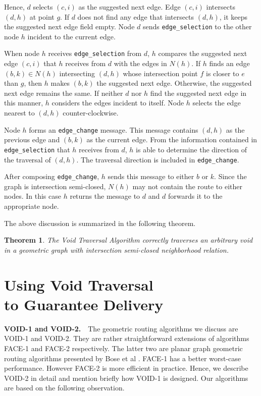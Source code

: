 \documentclass[conference]{IEEEtran}
\newtheorem{theorem}{Theorem}
\def\TT#1{\texttt{#1}}
\begin{document}
Hence, $d$ selects $(c,i)$ as the suggested next edge. Edge $(c,i)$
intersects $(d,h)$ at point $g$.  If $d$ does not find any edge that
intersects $(d,h)$, it keeps the suggested next edge field empty.
Node $d$ sends \TT{edge\_selection} to the other node $h$ incident to
the current edge.

When node $h$ receives \TT{edge\_selection} from $d$, $h$ compares the
suggested next edge $(c,i)$ that $h$ receives from $d$ with the edges
in $N(h)$.  If $h$ finds an edge $(b,k) \in N(h)$ intersecting $(d,h)$
whose intersection point $f$ is closer to $e$ than $g$, then $h$ makes
$(b,k)$ the suggested next edge. Otherwise, the suggested next edge
remains the same. If neither $d$ nor $h$ find the suggested next edge
in this manner, $h$ considers the edges incident to itself. Node $h$
selects the edge nearest to $(d,h)$ counter-clockwise.

Node $h$ forms an \TT{edge\_change} message. This message contains
$(d,h)$ as the previous edge and $(b,k)$ as the current edge.  From
the information contained in \TT{edge\_selection} that $h$ receives
from $d$, $h$ is able to determine the direction of the traversal of
$(d,h)$. The traversal direction is included in
\TT{edge\_change}. 

After composing \TT{edge\_change}, $h$ sends this message to either
$b$ or $k$.  Since the graph is intersection semi-closed, $N(h)$ may
not contain the route to either nodes. In this case $h$ returns the
message to $d$ and $d$ forwards it to the appropriate node.

The above discussion is summarized in the following theorem.

\begin{theorem}\label{TraversalOK}
The Void Traversal Algorithm correctly traverses an arbitrary void in
a geometric graph with intersection semi-closed neighborhood relation.
\end{theorem}

\section{Using Void Traversal \\ to Guarantee Delivery}
\label{SecRouting}

\textbf{VOID-1 and VOID-2.}\ \ The geometric routing algorithms we
discuss are VOID-1 and VOID-2.  They are rather straightforward
extensions of algorithms FACE-1 and FACE-2 respectively. The latter
two are planar graph geometric routing algorithms presented by Bose et
al \cite{Bose01}.  FACE-1 has a better worst-case performance. However
FACE-2 is more efficient in practice. Hence, we describe VOID-2 in
detail and mention briefly how VOID-1 is designed. Our algorithms are
based on the following observation.
\end{document}
